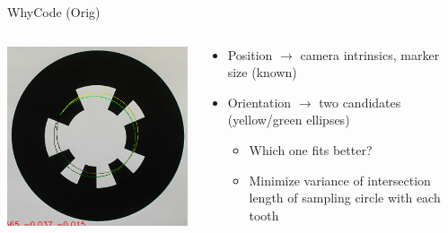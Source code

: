 \documentclass[aspectratio=169]{beamer}
\begin{document}
\begin{frame}{WhyCode (Orig)}
	\begin{columns}
	\begin{column}{0.4\textwidth}
		\centering
		\includegraphics[width=\linewidth]{./images/whycode_orig_both_solutions_cropped.png}
	\end{column}
	\begin{column}{0.6\textwidth}
	\begin{itemize}
		\item Position $\rightarrow$ camera intrinsics, marker size (known)
		\item Orientation $\rightarrow$ two candidates (yellow/green ellipses)
		\begin{itemize}
			\item Which one fits better?
			\item Minimize variance of intersection length of sampling circle with each tooth
		\end{itemize}
	\end{itemize}
	\end{column}
	\end{columns}
\end{frame}
\end{document}
